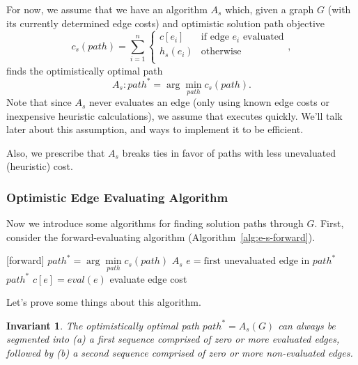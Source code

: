 \documentclass{article}
\newtheorem{invariant}{Invariant}
\begin{document}
For now, we assume that we have an algorithm $A_s$ which,
given a graph $G$ (with its currently determined edge costs)
and optimistic solution path objective
\begin{equation}
   c_s(path) = \sum_{i=1}^n \left\{
   \begin{array}{cl}
      c[e_i] & \mbox{if edge } e_i \mbox{ evaluated}  \\
      h_s(e_i) & \mbox{otherwise} \\
   \end{array}
   \right.
   ,
\label{eqn:solution-cost-objective}
\end{equation}
finds the optimistically optimal path
\begin{equation}
   A_s: path^* = \arg \min_{path} c_s(path).
\end{equation}
Note that since $A_s$ never evaluates an edge
(only using known edge costs or inexpensive heuristic calculations),
we assume that executes quickly.
We'll talk later about this assumption,
and ways to implement it to be efficient.

Also, we prescribe that $A_s$ breaks ties in favor of paths with less
unevaluated (heuristic) cost.

\subsubsection{Optimistic Edge Evaluating Algorithm}

Now we introduce some algorithms for finding solution paths through $G$.
First, consider the forward-evaluating algorithm
(Algorithm~\ref{alg:e-s-forward}).

\begin{algorithm}[h*]
\caption{$E_s$: Optimistic Edge Evaluator (Forward)}
\label{alg:e-s-forward}
\begin{algorithmic}[1]
 [forward]
\Loop
   \State $path^* = \arg \min\limits_{path} c_s(path)$ \Comment $A_s$
   \label{line:e-s-forward-pathstar}
   \State $e = \mbox{first unevaluated edge in } path^*$
      \State \Return $path^*$
   \EndIf
   \State $c[e] = eval(e)$ \Comment evaluate edge cost
\EndLoop
\EndProcedure
\end{algorithmic}
\end{algorithm}

Let's prove some things about this algorithm.

\begin{invariant}
The optimistically optimal path $path^* = A_s(G)$ can always be
segmented into
(a) a first sequence comprised of zero or more evaluated edges,
followed by
(b) a second sequence comprised of zero or more non-evaluated edges.
\label{inv:path-segmentation}
\end{invariant}
\end{document}
